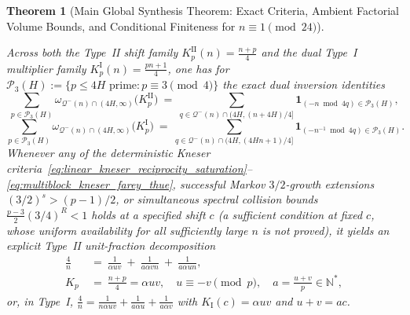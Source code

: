 \documentclass[11pt, a4paper]{article}
\theoremstyle{plain}
\newtheorem{theorem}{Theorem}[section]
\theoremstyle{definition}
\newcommand{\N}{\mathbb{N}}
\newcommand{\I}{\mathrm{I}}
\begin{document}
\begin{theorem}[Main Global Synthesis Theorem: Exact Criteria, Ambient Factorial Volume Bounds, and Conditional Finiteness for $n\equiv1\pmod{24}$]
\begin{enumerate}[(a)]
\begin{enumerate}[(i)]
        Across both the Type~II shift family $K_p^{\mathrm{II}}(n)=\frac{n+p}{4}$ and the dual Type~I multiplier family $K_p^{\mathrm{I}}(n)=\frac{pn+1}{4}$, one has for $\mathcal{P}_3(H):=\{p\le 4H\text{ prime}:p\equiv3\pmod 4\}$ the exact dual inversion identities
        \[
        \sum_{p\in\mathcal{P}_3(H)}\omega_{\mathcal{Q}^{-}(n)\cap(4H,\infty)}\!\big(K_p^{\mathrm{II}}\big)\ =\ \sum_{q\in\mathcal{Q}^{-}(n)\cap(4H,(n+4H)/4]}\mathbf{1}_{(-n\bmod 4q)\in\mathcal{P}_3(H)},
        \]
        \[
        \sum_{p\in\mathcal{P}_3(H)}\omega_{\mathcal{Q}^{-}(n)\cap(4H,\infty)}\!\big(K_p^{\mathrm{I}}\big)\ =\ \sum_{q\in\mathcal{Q}^{-}(n)\cap(4H,(4Hn+1)/4]}\mathbf{1}_{(-n^{-1}\bmod 4q)\in\mathcal{P}_3(H)}.
        \]
        Whenever any of the deterministic Kneser criteria~\eqref{eq:linear_kneser_reciprocity_saturation}--\eqref{eq:multiblock_kneser_farey_thue}, successful Markov $3/2$-growth extensions $(3/2)^{s}>(p-1)/2$, or simultaneous spectral collision bounds $\frac{p-3}{2}(3/4)^{R}<1$ holds at a specified shift $c$ (a sufficient condition at fixed $c$, whose uniform availability for all sufficiently large $n$ is not proved), it yields an explicit Type~II unit-fraction decomposition
        \begin{equation}\label{eq:explicit_typeII_reconstruction}
        \begin{split}
        \frac{4}{n}\ &=\ \frac{1}{\alpha uv}\ +\ \frac{1}{a\alpha vn}\ +\ \frac{1}{a\alpha un},\\
        K_p\ &=\ \frac{n+p}{4}=\alpha uv,\quad u\equiv-v\pmod p,\quad a=\frac{u+v}{p}\in\N^{\ast},
        \end{split}
        \end{equation}
        or, in Type~I, $\frac{4}{n}=\frac{1}{n\alpha uv}+\frac{1}{a\alpha u}+\frac{1}{a\alpha v}$ with $K_{\I}(c)=\alpha uv$ and $u+v=ac$.
    \end{enumerate}


\end{enumerate}
\end{theorem}
\end{document}
